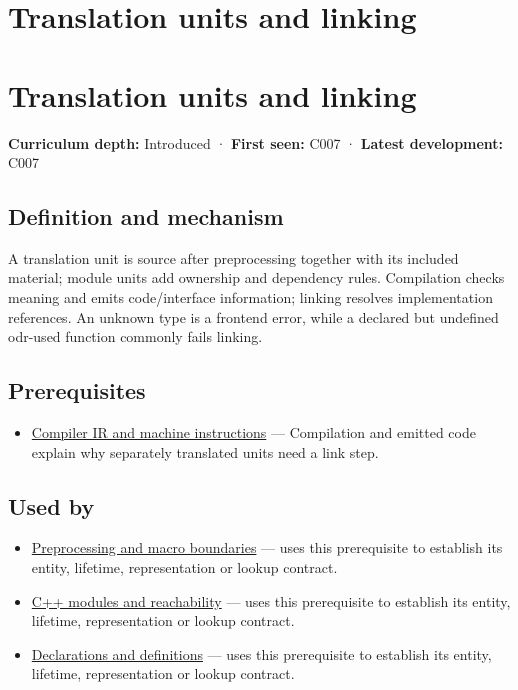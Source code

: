 \hypertarget{appendix-806686359e1b}{}
\section*{Translation units and linking}
\section{Translation units and linking}\label{translation-units-and-linking}

\textbf{Curriculum depth:} Introduced · \textbf{First seen:} C007 · \textbf{Latest development:} C007

\subsection{Definition and mechanism}\label{definition-and-mechanism}

A translation unit is source after preprocessing together with its included material; module units add ownership and dependency rules. Compilation checks meaning and emits code/interface information; linking resolves implementation references. An unknown type is a frontend error, while a declared but undefined odr-used function commonly fails linking.

\subsection{Prerequisites}\label{prerequisites}

\begin{itemize}
\tightlist
\item
  \hyperref[appendix-942ad41afb30]{Compiler IR and machine instructions} --- Compilation and emitted code explain why separately translated units need a link step.
\end{itemize}

\subsection{Used by}\label{used-by}

\begin{itemize}
\item
  \hyperref[appendix-33c0a92ce855]{Preprocessing and macro boundaries} --- uses this prerequisite to establish its entity, lifetime, representation or lookup contract.
\item
  \hyperref[appendix-410a611a5b8d]{C++ modules and reachability} --- uses this prerequisite to establish its entity, lifetime, representation or lookup contract.
\item
  \hyperref[appendix-2e4d494c2d94]{Declarations and definitions} --- uses this prerequisite to establish its entity, lifetime, representation or lookup contract.
\end{itemize}

